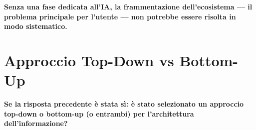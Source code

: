 \begin{tcolorbox}[colback=backgroundColor,colframe=borderColor,arc=2mm]
{\textbf{Senza una fase dedicata all'IA, la frammentazione dell'ecosistema --- il problema principale per l'utente --- non potrebbe essere risolta in modo sistematico.}
}
\end{tcolorbox}

\vspace{0.5cm}

\section{Approccio Top-Down vs Bottom-Up}

\begin{tcolorbox}[colback=primaryColor!10,colframe=primaryColor,arc=2mm]
\large\textbf{Se la risposta precedente è stata sì: è stato selezionato un approccio top-down o bottom-up (o entrambi) per l'architettura dell'informazione?}
\end{tcolorbox}

\vspace{0.3cm}

